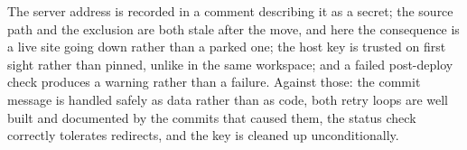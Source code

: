 The server address is recorded in a comment describing it as a secret; the
 source path and the  exclusion are both stale after the
move, and here the consequence is a live site going down rather than a parked one;
the host key is trusted on first sight rather than pinned, unlike
 in the same workspace; and a failed post-deploy check
produces a warning rather than a failure. Against those: the commit message is
handled safely as data rather than as code, both retry loops are well built and
documented by the commits that caused them, the status check correctly tolerates
redirects, and the key is cleaned up unconditionally.
